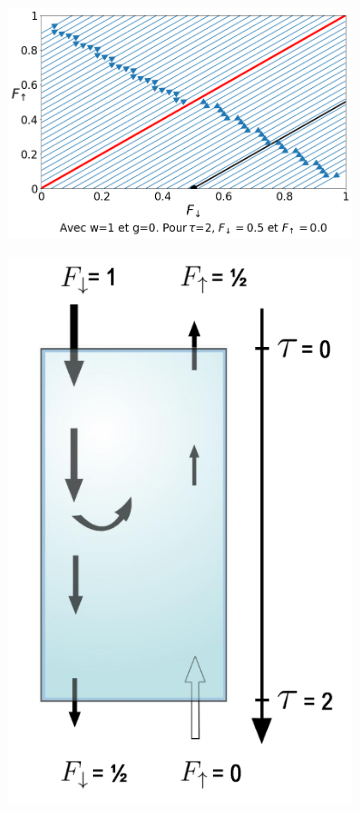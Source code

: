 \documentclass[12pt]{article}
\begin{document}
\begin{figure}[H]
    \centering
    
    \begin{subfigure}{0.625\textwidth}
      \centering
      \includegraphics[width=1\textwidth]{Graphe/Figure W=1.png}
      \captionsetup{width=.85\textwidth}
      \caption{} 
      \label{fig:Sub_Graphe_W=1}
    \end{subfigure}
    \begin{subfigure}{0.305\textwidth}
        \centering
        \includegraphics[width=1\textwidth]{Schema/W=1.png}

\end{subfigure}
\end{figure}
\end{document}
